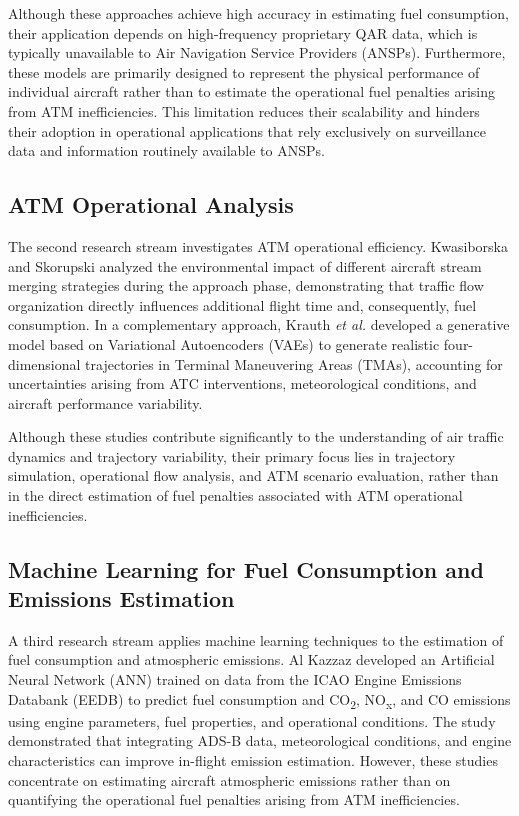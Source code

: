 Although these approaches achieve high accuracy in estimating fuel consumption, their application depends on high-frequency proprietary QAR data, which is typically unavailable to Air Navigation Service Providers (ANSPs). Furthermore, these models are primarily designed to represent the physical performance of individual aircraft rather than to estimate the operational fuel penalties arising from ATM inefficiencies. This limitation reduces their scalability and hinders their adoption in operational applications that rely exclusively on surveillance data and information routinely available to ANSPs.

\subsection{ATM Operational Analysis}
The second research stream investigates ATM operational efficiency. Kwasiborska and Skorupski \cite{kwasiborska2021merging} analyzed the environmental impact of different aircraft stream merging strategies during the approach phase, demonstrating that traffic flow organization directly influences additional flight time and, consequently, fuel consumption. In a complementary approach, Krauth \textit{et al.} \cite{krauth2023generative} developed a generative model based on Variational Autoencoders (VAEs) to generate realistic four-dimensional trajectories in Terminal Maneuvering Areas (TMAs), accounting for uncertainties arising from ATC interventions, meteorological conditions, and aircraft performance variability.

Although these studies contribute significantly to the understanding of air traffic dynamics and trajectory variability, their primary focus lies in trajectory simulation, operational flow analysis, and ATM scenario evaluation, rather than in the direct estimation of fuel penalties associated with ATM operational inefficiencies.

\subsection{Machine Learning for Fuel Consumption and Emissions Estimation}
A third research stream applies machine learning techniques to the estimation of fuel consumption and atmospheric emissions. Al Kazzaz \cite{alkazzaz2025emissions} developed an Artificial Neural Network (ANN) trained on data from the ICAO Engine Emissions Databank (EEDB) to predict fuel consumption and CO\textsubscript{2}, NO\textsubscript{x}, and CO emissions using engine parameters, fuel properties, and operational conditions. The study demonstrated that integrating ADS-B data, meteorological conditions, and engine characteristics can improve in-flight emission estimation. However, these studies concentrate on estimating aircraft atmospheric emissions rather than on quantifying the operational fuel penalties arising from ATM inefficiencies.


